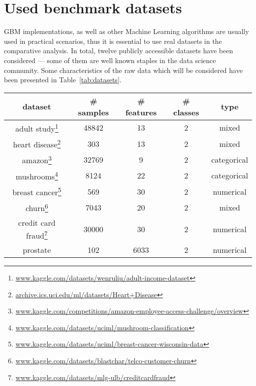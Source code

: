 \documentclass[magisterska, english]{pwr_wmat_praca_dyplomowa}
\theoremstyle{plain}
\numberwithin{theorem}{chapter}
\theoremstyle{definition}
\numberwithin{theorem}{chapter}
\begin{document}
\section{Used benchmark datasets}\label{section:real_datasets}
GBM implementations, as well as other Machine Learning algorithms are usually used in practical scenarios, thus it is essential to use real datasets in the comparative analysis. In total, twelve publicly accessible datasets have been considered --- some of them are well known staples in the data science community. Some characteristics of the raw data which will be considered have been presented in Table~\ref{tab:datasets}.
\newpage
\begin{table}[h!] %
\centering
\begin{tabular}{|c|c|c|c|c|}
\hline
\textbf{dataset}  & \textbf{\# samples} & \textbf{\# features} & \textbf{\# classes} & \textbf{type} \\ \hline
adult study\footnote{\url{www.kaggle.com/datasets/wenruliu/adult-income-dataset}}       & 48842              & 13                  & 2                  & mixed         \\ \hline
heart disease\footnote{\url{archive.ics.uci.edu/ml/datasets/Heart+Disease}}     & 303                & 13                  & 2                  & mixed         \\ \hline
amazon\footnote{\url{www.kaggle.com/competitions/amazon-employee-access-challenge/overview}}            & 32769              & 9                   & 2                  & categorical   \\ \hline
mushrooms\footnote{\url{www.kaggle.com/datasets/uciml/mushroom-classification}}           & 8124               & 22                  & 2                  & categorical   \\ \hline
breast cancer\footnote{\url{www.kaggle.com/datasets/uciml/breast-cancer-wisconsin-data}}     & 569                & 30                  & 2                  & numerical     \\ \hline
churn\footnote{\url{www.kaggle.com/datasets/blastchar/telco-customer-churn}}             & 7043               & 20                  & 2                  & mixed         \\ \hline
credit card fraud\footnote{\url{www.kaggle.com/datasets/mlg-ulb/creditcardfraud}} & 30000              & 30                  & 2                  & numerical     \\ \hline
prostate \cite{microrray_data}        & 102                & 6033                & 2                  & numerical     \\ \hline

\end{tabular}
\end{table}
\end{document}
